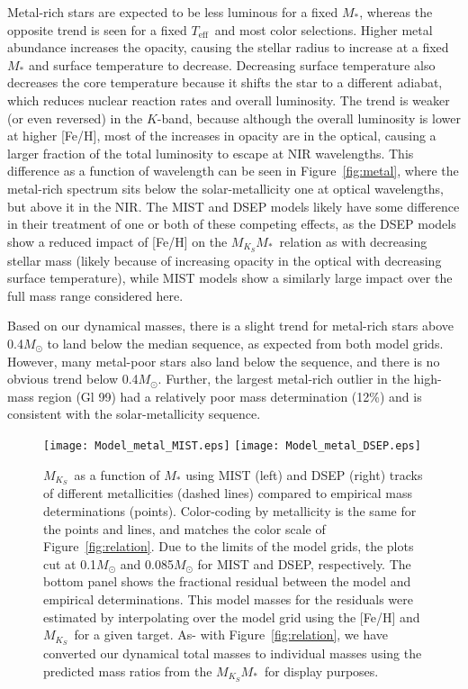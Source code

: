 \documentclass[twocolumn]{aastex62}
\newcommand\teff{\ensuremath{T_\text{eff}}}
\newcommand{\mks}{$M_{K_S}$}
\newcommand{\mmk}{$M_{K_S}$\textendash$M_*$}
\begin{document}
Metal-rich stars are expected to be less luminous for a fixed $M_*$, whereas the opposite trend is seen for a fixed \teff\ and most color selections. Higher metal abundance increases the opacity, causing the stellar radius to increase at a fixed $M_*$ and surface temperature to decrease. Decreasing surface temperature also decreases the core temperature because it shifts the star to a different adiabat, which reduces nuclear reaction rates and overall luminosity. The trend is weaker (or even reversed) in the $K$-band, because although the overall luminosity is lower at higher [Fe/H], most of the increases in opacity are in the optical, causing a larger fraction of the total luminosity to escape at NIR wavelengths. This difference as a function of wavelength can be seen in Figure~\ref{fig:metal}, where the metal-rich spectrum sits below the solar-metallicity one at optical wavelengths, but above it in the NIR. The MIST and DSEP models likely have some difference in their treatment of one or both of these competing effects, as the DSEP models show a reduced impact of [Fe/H] on the \mmk\ relation as with decreasing stellar mass (likely because of increasing opacity in the optical with decreasing surface temperature), while MIST models show a similarly large impact over the full mass range considered here. 

Based on our dynamical masses, there is a slight trend for metal-rich stars above 0.4$M_\odot$ to land below the median sequence, as expected from both model grids. However, many metal-poor stars also land below the sequence, and there is no obvious trend below 0.4$M_\odot$. Further, the largest metal-rich outlier in the high-mass region (Gl 99) had a relatively poor mass determination (12\%) and is consistent with the solar-metallicity sequence. 

\begin{figure}[htp]
\begin{center}
\texttt{[image: Model\_metal\_MIST.eps]}
\texttt{[image: Model\_metal\_DSEP.eps]}
\caption{\mks\ as a function of $M_*$ using MIST (left) and DSEP (right) tracks of different metallicities (dashed lines) compared to empirical mass determinations (points). Color-coding by metallicity is the same for the points and lines, and matches the color scale of Figure~\ref{fig:relation}. Due to the limits of the model grids, the plots cut at 0.1$M_\odot$ and 0.085$M_\odot$ for MIST and DSEP, respectively. The bottom panel shows the fractional residual between the model and empirical determinations. This model masses for the residuals were estimated by interpolating over the model grid using the [Fe/H] and \mks\ for a given target. As- with Figure~\ref{fig:relation}, we have converted our dynamical total masses to individual masses using the predicted mass ratios from the \mmk\ for display purposes. }
\label{fig:mk_metal}
\end{center}
\end{figure}
\end{document}
